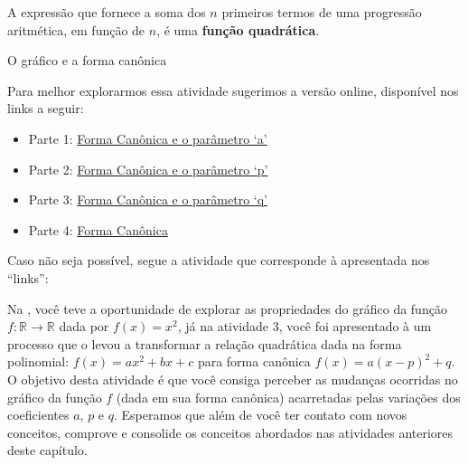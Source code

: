 \begin{observation}{}

A expressão que fornece a soma dos \(n\) primeiros termos de uma progressão aritmética, em função de \(n\), é uma \textbf{função quadrática}.
\end{observation}


\label{\detokenize{AF209-5:sec-funcao-quadratica-parametros-grafico}}\label{\detokenize{AF209-5::doc}}\label{\detokenize{AF209-5:explorando-os-parametros-da-forma-canonica-e-o-grafico-da-funcao-quadratica}}\label{\detokenize{AF209-5:ativ-funcao-quadratica-graf-curva}}
\begin{task}{O gráfico e a forma canônica}



Para melhor explorarmos essa atividade sugerimos a versão online, disponível nos links a seguir:
\begin{itemize}
\item {} 
Parte 1: \href{https://ggbm.at/jdFEcyav}{Forma Canônica e o parâmetro ‘a’}

\item {} 
Parte 2: \href{https://ggbm.at/DmKxRtU9}{Forma Canônica e o parâmetro ‘p’}

\item {} 
Parte 3: \href{https://ggbm.at/Qcm5QFjH}{Forma Canônica e o parâmetro ‘q’}

\item {} 
Parte 4: \href{https://ggbm.at/jVJh78hz}{Forma Canônica}

\end{itemize}

Caso não seja possível, segue a atividade que corresponde à apresentada nos “links”:

Na , você teve a oportunidade de explorar as propriedades do gráfico da função \(f:\mathbb{R}\to\mathbb{R}\) dada por \(f(x)=x^2\), já na atividade 3, você foi apresentado à um processo que o levou a transformar a relação quadrática dada na forma polinomial: \(f(x)=ax^2 + bx + c\) para forma canônica \(f(x)=a(x-p)^2+q\). O objetivo desta atividade é que você consiga perceber as mudanças ocorridas no gráfico da função \(f\) (dada em sua forma canônica) acarretadas pelas variações dos coeficientes \(a\), \(p\) e \(q\). Esperamos que além de você ter contato com novos conceitos, comprove e consolide os conceitos abordados nas atividades anteriores deste capítulo.


\end{task}
